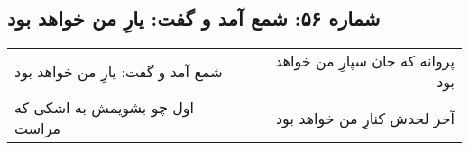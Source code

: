 \begin{center}
\section*{شماره ۵۶: شمع آمد و گفت: یارِ من خواهد بود}
\label{sec:056}
\begin{longtable}{l p{0.5cm} r}
شمع آمد و گفت: یارِ من خواهد بود
&&
پروانه که جان سپارِ من خواهد بود
\\
اول چو بشویمش به اشکی که مراست
&&
آخر لحدش کنارِ من خواهد بود
\\
\end{longtable}
\end{center}
